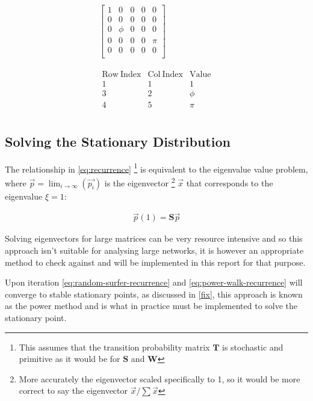 \documentclass[11pt]{report}
\begin{document}
\begin{align}
    \begin{bmatrix}
	1 & 0 & 0 & 0 & 0 \\
	0 & 0 & 0 & 0 & 0 \\
	0 & \phi & 0 & 0 & 0 \\
	0 & 0 & 0 & 0 & \pi \\
	0 & 0 & 0 & 0 & 0 \\
    \end{bmatrix}  \label{eq:ordinary} \\
    \ \nonumber \\
    \ \nonumber \\
    \begin{matrix}
	\mathrm{Row\ Index} & \mathrm{Col\ Index} & \mathrm{Value}\\
	1 & 1 & 1 \\
	3 & 2 & \phi \\
	4 & 5 & \pi \\
    \end{matrix}  \label{eq:crc}
\end{align}


\subsection{Solving the Stationary Distribution}
\label{solving-stationary-dist}
The relationship in \eqref{eq:recurrence} \footnote{This assumes that the transition probability matrix \(\mathbf{T}\) is stochastic and primitive as it would be for \(\mathbf{S}\)
and \(\mathbf{W}\)} is equivalent to the eigenvalue value problem, where
\(\vec{p} = \lim_{i \rightarrow \infty} \left( \vec{p_{i}}\right)\) is the
eigenvector \footnote{More accurately the eigenvector scaled specifically to 1, so it would be more correct to say the eigenvector \(\vec{x} / \sum \vec{x}\)} \(\vec{x}\) that corresponds to the eigenvalue \(\xi=1\):

\begin{align}
\vec{p} (1) = \mathbf{S} \vec{p} \label{eq:eigenprob}
\end{align}

Solving eigenvectors for large matrices can be very resource intensive and so
this approach isn't suitable for analysing large networks, it is however an appropriate method to check against and will be implemented in this report for that purpose.

Upon iteration \eqref{eq:random-surfer-recurrence} and \eqref{eq:power-walk-recurrence} will converge to stable stationary points, as discussed
in \ref{fix}, this approach is known as the power method
\cite{larsonElementaryLinearAlgebra1991a} and is what in practice must be
implemented to solve the stationary point.
\end{document}
